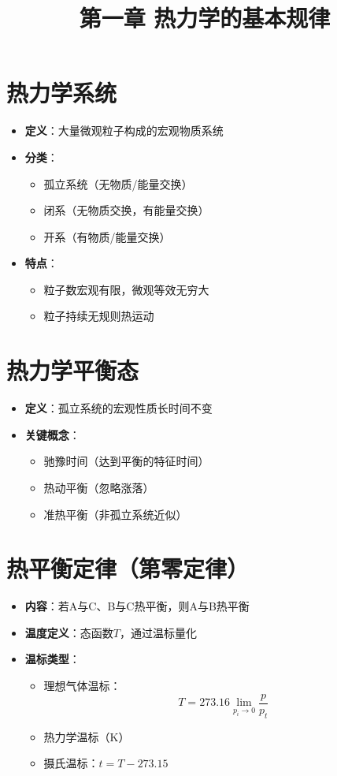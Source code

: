 \documentclass[12pt]{article}
\title{第一章 热力学的基本规律}
\author{}
\date{}
\begin{document}
\maketitle

\section{热力学系统}
\begin{itemize}
    \item \textbf{定义}：大量微观粒子构成的宏观物质系统
    \item \textbf{分类}：
    \begin{itemize}
        \item 孤立系统（无物质/能量交换）
        \item 闭系（无物质交换，有能量交换）
        \item 开系（有物质/能量交换）
    \end{itemize}
    \item \textbf{特点}：
    \begin{itemize}
        \item 粒子数宏观有限，微观等效无穷大
        \item 粒子持续无规则热运动
    \end{itemize}
\end{itemize}

\section{热力学平衡态}
\begin{itemize}
    \item \textbf{定义}：孤立系统的宏观性质长时间不变
    \item \textbf{关键概念}：
    \begin{itemize}
        \item 驰豫时间（达到平衡的特征时间）
        \item 热动平衡（忽略涨落）
        \item 准热平衡（非孤立系统近似）
    \end{itemize}
\end{itemize}

\section{热平衡定律（第零定律）}
\begin{itemize}
    \item \textbf{内容}：若A与C、B与C热平衡，则A与B热平衡
    \item \textbf{温度定义}：态函数$T$，通过温标量化
    \item \textbf{温标类型}：
    \begin{itemize}
        \item 理想气体温标：
        \begin{equation}
            T = 273.16 \lim_{p_i \to 0} \frac{p}{p_t}
        \end{equation}
        \item 热力学温标（K）
        \item 摄氏温标：$t = T - 273.15$
    \end{itemize}
\end{itemize}
\end{document}
